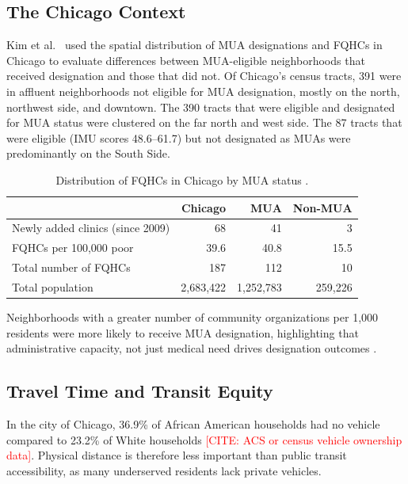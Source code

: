 \documentclass[11pt]{article}
\begin{document}
\subsection{The Chicago Context}\label{sec:chicago}

Kim et al.\ \cite{kim2020uneven} used the spatial distribution of MUA designations and FQHCs in Chicago to evaluate 
differences between MUA-eligible neighborhoods that received designation and those that did not. Of Chicago's census 
tracts, 391 were in affluent neighborhoods not eligible for MUA designation, mostly on the north, northwest side, and 
downtown. The 390 tracts that were eligible and designated for MUA status were clustered on the far north and west side. 
The 87 tracts that were eligible (IMU scores 48.6--61.7) but not designated as MUAs were predominantly on the South Side.

\begin{table}[h]
\centering
\caption{Distribution of FQHCs in Chicago by MUA status \cite{kim2020uneven}.}
\label{tab:mua-distribution}
\begin{tabular}{lrrr}
\toprule
 & Chicago & MUA & Non-MUA \\
\midrule
Newly added clinics (since 2009) & 68 & 41 & 3 \\
FQHCs per 100,000 poor & 39.6 & 40.8 & 15.5 \\
Total number of FQHCs & 187 & 112 & 10 \\
Total population & 2,683,422 & 1,252,783 & 259,226 \\
\bottomrule
\end{tabular}
\end{table}

Neighborhoods with a greater number of community organizations per 1,000 residents were more likely to receive MUA 
designation, highlighting that administrative capacity, not just medical need drives designation outcomes \cite{kim2020uneven}.


\subsection{Travel Time and Transit Equity}\label{sec:travel}

In the city of Chicago, 36.9\% of African American households had no vehicle compared to 23.2\% of White households \textcolor{red}{[CITE: ACS or census vehicle ownership data]}.
Physical distance is therefore less important than public transit accessibility, as many underserved residents lack
private vehicles.
\end{document}
